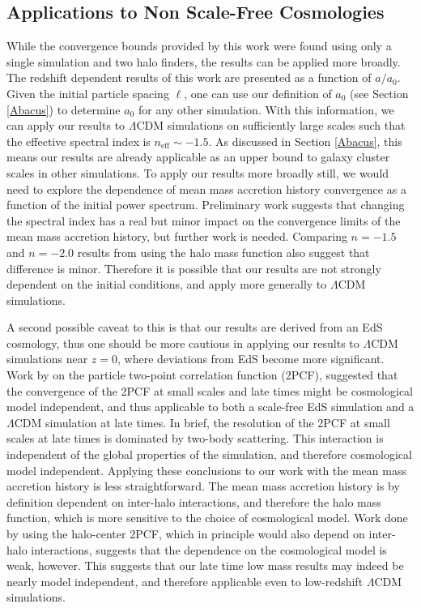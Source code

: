 \subsection{Applications to Non Scale-Free Cosmologies}\label{LCDM}
While the convergence bounds provided by this work were found using only a single simulation and two halo finders, the results can be applied more broadly. The redshift dependent results of this work are presented as a function of $a/a_0$. Given the initial particle spacing $\ell$, one can use our definition of $a_0$ (see Section \ref{Abacus}) to determine $a_0$ for any other simulation. With this information, we can apply our results to $\Lambda$CDM simulations on sufficiently large scales such that the effective spectral index is $n_{\mathrm{eff}}\sim-1.5$. As discussed in Section \ref{Abacus}, this means our results are already applicable as an upper bound to galaxy cluster scales in other simulations. To apply our results more broadly still, we would need to explore the dependence of mean mass accretion history convergence as a function of the initial power spectrum. Preliminary work suggests that changing the spectral index has a real but minor impact on the convergence limits of the mean mass accretion history, but further work is needed. Comparing $n=-1.5$ and $n=-2.0$ results from \cite{Maleubre_2024} using the halo mass function also suggest that difference is minor. Therefore it is possible that our results are not strongly dependent on the initial conditions, and apply more generally to $\Lambda$CDM simulations.

A second possible caveat to this is that our results are derived from an EdS cosmology, thus one should be more cautious in applying our results to $\Lambda$CDM simulations near $z=0$, where deviations from EdS become more significant. Work by \cite{Joyce_2021} on the particle two-point correlation function (2PCF), suggested that the convergence of the 2PCF at small scales and late times might be cosmological model independent, and thus applicable to both a scale-free EdS simulation and a $\Lambda$CDM simulation at late times. In brief, the resolution of the 2PCF at small scales at late times is dominated by two-body scattering. This interaction is independent of the global properties of the simulation, and therefore cosmological model independent. Applying these conclusions to our work with the mean mass accretion history is less straightforward. The mean mass accretion history is by definition dependent on inter-halo interactions, and therefore the halo mass function, which is more sensitive to the choice of cosmological model. Work done by \cite{Maleubre_2024} using the halo-center 2PCF, which in principle would also depend on inter-halo interactions, suggests that the dependence on the cosmological model is weak, however. This suggests that our late time low mass results may indeed be nearly model independent, and therefore applicable even to low-redshift $\Lambda$CDM simulations.


